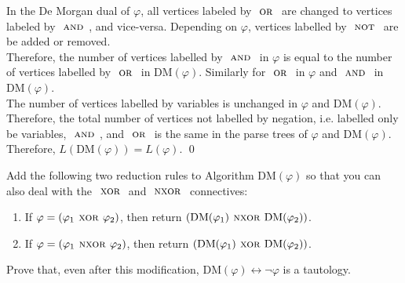 \documentclass[fleqn, a4paper, 12pt, oneside]{amsart}
\theoremstyle{definition}
\theoremstyle{theorem}
\theoremstyle{remark}
\newcommand{\Not}{{\textsc{ not }}}
\renewcommand{\And}{{\textsc{ and }}}
\newcommand{\Or}{{\textsc{ or }}}
\newcommand{\Xor}{{\textsc{ xor }}}
\newcommand{\Nxor}{{\textsc{ nxor }}}
\newcommand{\logequiv}{\leftrightarrow}
\begin{document}
\begin{solution}
	In the De Morgan dual of $\varphi$, all vertices labeled by $\Or$ are changed to vertices labeled by $\And$, and vice-versa.
	Depending on $\varphi$, vertices labelled by $\Not$ are be added or removed.\\
	Therefore, the number of vertices labelled by $\And$ in $\varphi$ is equal to the number of vertices labelled by $\Or$ in $\mathrm{DM}(\varphi)$.
	Similarly for $\Or$ in $\varphi$ and $\And$ in $\mathrm{DM}(\varphi)$.\\
	The number of vertices labelled by variables is unchanged in $\varphi$ and $\mathrm{DM}(\varphi)$.\\
	Therefore, the total number of vertices not labelled by negation, i.e. labelled only be variables, $\And$, and $\Or$ is the same in the parse trees of $\varphi$ and $\mathrm{DM}(\varphi)$.
	Therefore, $L \left( \mathrm{DM}(\varphi) \right) = L(\varphi)$.
	\qed
\end{solution}

\addtocounter{question}{1}

%
%

\begin{question}
	Add the following two reduction rules to Algorithm $\mathrm{DM}(\varphi)$ so that you can also deal with the $\Xor$ and $\Nxor$ connectives:
	\begin{enumerate}
		\item If $\varphi = (\varphi_1 \Xor \varphi_2)$, then return $(\mathrm{DM}(\varphi_1) \Nxor \mathrm{DM}(\varphi_2))$.
		\item If $\varphi = (\varphi_1 \Nxor \varphi_2)$, then return $(\mathrm{DM}(\varphi_1) \Xor \mathrm{DM}(\varphi_2))$.
	\end{enumerate}
	Prove that, even after this modification, $\mathrm{DM}(\varphi) \logequiv \neg \varphi$ is a tautology.
\end{question}
\end{document}
